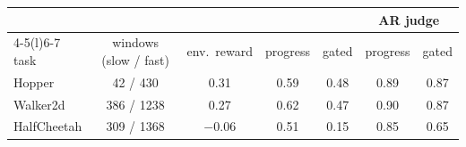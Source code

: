\begin{tabular}{@{}lcccccc@{}}
\toprule
 & & & \multicolumn{2}{c}{\kev{}} & \multicolumn{2}{c}{AR judge} \\ \cmidrule(lr){4-5}\cmidrule(l){6-7}
task & windows (slow / fast) & env.\ reward & progress & gated & progress & gated \\ \midrule
Hopper & 42 / 430 & 0.31 & 0.59 & 0.48 & 0.89 & 0.87 \\
Walker2d & 386 / 1238 & 0.27 & 0.62 & 0.47 & 0.90 & 0.87 \\
HalfCheetah & 309 / 1368 & $-$0.06 & 0.51 & 0.15 & 0.85 & 0.65 \\
\bottomrule
\end{tabular}

